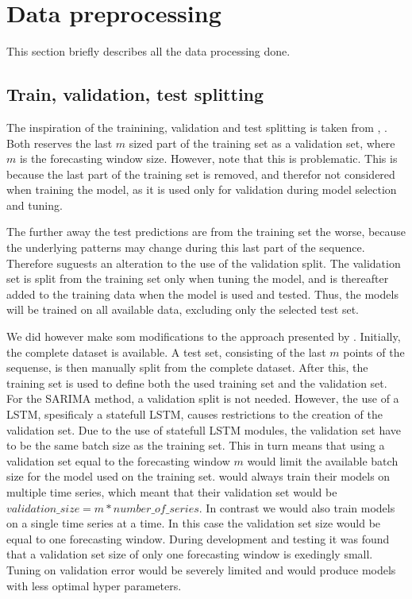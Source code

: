 \section{Data preprocessing}
\label{section:Data:Preprocessing}
This section briefly describes all the data processing done.

\subsection{Train, validation, test splitting}

The inspiration of the trainining, validation and test splitting is taken from
\cite{Bandara2019}, \cite{Hewamalage2021}.
Both reserves the last $m$ sized part of the training set as a validation set,
where $m$ is the forecasting window size.
However, \cite{Hewamalage2021} note that this is problematic.
This is because the last part of the training set is removed,
and therefor not considered when training the model, as it is used only for validation during model selection and tuning.

The further away the test predictions are from the training set the worse,
because the underlying patterns may change during this last part of the sequence.
Therefore \cite{Hewamalage2021} suguests an alteration to the use of the validation split.
The validation set is split from the training set only when tuning the model,
and is thereafter added to the training data when the model is used and tested. 
Thus, the models will be trained on all available data, excluding only the selected test set.

We did however make som modifications to the approach presented by \cite{Hewamalage2021}.
Initially, the complete dataset is available.
A test set, consisting of the last $m$ points of the sequense, is then manually split from the complete dataset.
After this, the training set is used to define both the used training set and the validation set.
For the SARIMA method, a validation split is not needed.
However, the use of a LSTM, spesificaly a statefull LSTM, causes restrictions to the creation of the validation set.
Due to the use of statefull LSTM modules, the validation set have to be the same batch size as the training set.
This in turn means that using a validation set equal to the forecasting window $m$ would limit the available batch size for the model
used on the training set.
\cite{Bandara2019} would always train their models on multiple time series,
which meant that their validation set would be $validation\_size = m * number\_of\_series$.
In contrast we would also train models on a single time series at a time.
In this case the validation set size would be equal to one forecasting window.
During development and testing it was found that a validation set size of only one forecasting window is exedingly small.
Tuning on validation error would be severely limited and would produce models with less optimal hyper parameters.

